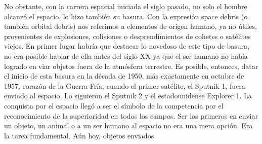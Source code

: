\documentclass[12pt,letterpaper]{article}
\begin{document}
\begin{multicols}{2}
\noindent No obstante, con la carrera espacial iniciada el siglo pasado, no solo el hombre alcanzó el espacio, lo hizo también su basura. Con la expresión space debris (o también orbital debris) nos referimos a elementos de origen humano, ya no útiles, provenientes de explosiones, colisiones o desprendimientos de cohetes o satélites viejos. En primer lugar habría que destacar lo novedoso de este tipo de basura, no era posible hablar de ella antes del siglo XX ya que el ser humano no había logrado enviar objetos fuera de la atmósfera terrestre. Es posible, entonces, datar el inicio de esta basura en la década de 1950, más exactamente en octubre de 1957, corazón de la Guerra Fría, cuando el primer satélite, el Sputnik 1, fuera enviado al espacio. Lo siguieron el Sputnik 2 y el estadounidense Explorer 1. La conquista por el espacio llegó a ser el símbolo de la competencia por el reconocimiento de la superioridad en todos los campos. Ser los primeros en enviar un objeto, un animal o a un ser
humano al espacio no era una mera opción. Era la tarea fundamental. Aún hoy, objetos enviados 

\end{multicols}
\newpage

\pagestyle{fancy}
        \fancyhf{}
        \rhead{}
  
\end{document}
